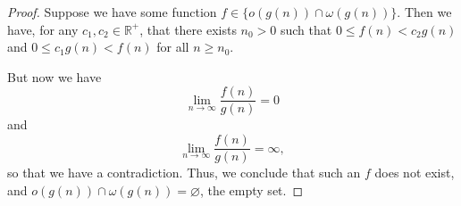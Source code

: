 
\begin{proof}
    Suppose we have some function $f \in \lbrace o(g(n)) \cap \omega(g(n)) \rbrace$.
    Then we have, for any $c_1, c_2 \in \mathbb{R}^+$, that there exists $n_0 > 0$
    such that $0 \leq f(n) < c_2 g(n)$ and $0 \leq c_1 g(n) < f(n)$ for all 
    $n \geq n_0$.
    
    But now we have 
    \[
        \lim_{n \to \infty}{\frac{f(n)}{g(n)}} = 0
    \]
    and
    \[
        \lim_{n \to \infty}{\frac{f(n)}{g(n)}} = \infty,
    \]
    so that we have a contradiction. Thus, we conclude that such an $f$ does not exist, 
    and $o(g(n)) \cap \omega(g(n)) = \varnothing$, the empty set.
\end{proof}
